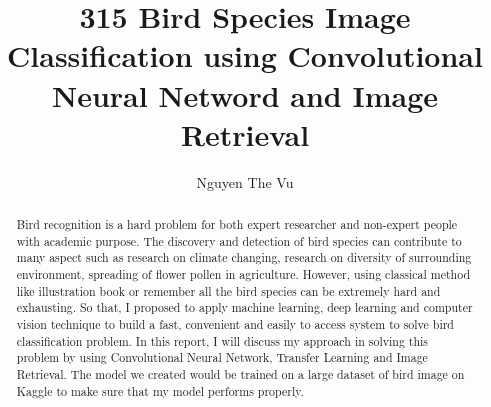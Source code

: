 \documentclass[runningheads]{llncs}
\begin{document}

\title{315 Bird Species Image Classification using Convolutional
Neural Netword and Image Retrieval}
\author{Nguyen The Vu}
%
\authorrunning{    }
\maketitle             
\begin{abstract}
Bird recognition is a hard problem for both expert researcher and non-expert people with academic purpose. The discovery and detection of bird species can contribute to many aspect such as research on climate changing, research on diversity of surrounding environment, spreading of flower pollen in agriculture. However, using classical method like illustration book or remember all the bird species can be extremely hard and exhausting. So that, I proposed to apply machine learning, deep learning and computer vision technique to build a fast, convenient and easily to access system to solve bird classification problem. In this report, I will discuss my approach in solving this problem by using Convolutional Neural Network, Transfer Learning and Image Retrieval. The model we created would be trained on a large dataset of bird image on Kaggle to make sure that my model performs properly.
\end{abstract}

\end{document}
